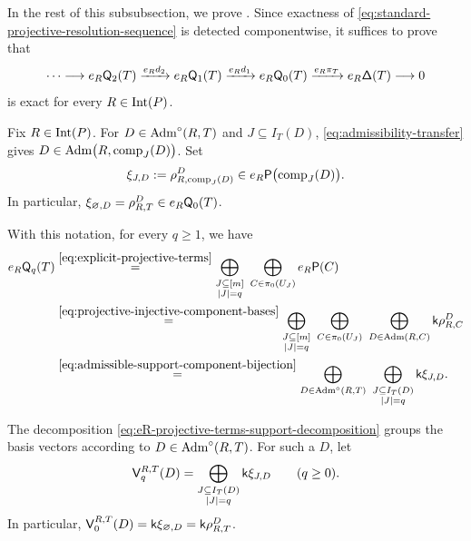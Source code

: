 In the rest of this subsubsection, we prove
.
Since exactness of
\eqref{eq:standard-projective-resolution-sequence}
is detected componentwise, it suffices to prove that
\begin{equation}
\label{eq:eR-standard-projective-resolution-sequence}
\cdots
\longrightarrow
e_R\mathsf Q_2(T)
\xrightarrow{e_Rd_2}
e_R\mathsf Q_1(T)
\xrightarrow{e_Rd_1}
e_R\mathsf Q_0(T)
\xrightarrow{e_R\pi_T}
e_R\mathsf\Delta(T)
\longrightarrow0
\end{equation}
is exact for every $R\in\operatorname{Int}(P)$.

Fix $R\in\operatorname{Int}(P)$. For $D\in\operatorname{Adm}^\circ(R,T)$ and
$J\subseteq I_T(D)$,
\eqref{eq:admissibility-transfer} gives
$D\in\operatorname{Adm}\bigl(R,\operatorname{comp}_J(D)\bigr)$. Set
\begin{equation}
\label{eq:xiJD-definition}
\xi_{J,D}
:=
\rho_{R,\operatorname{comp}_J(D)}^{D}
\in
e_R\mathsf P\bigl(\operatorname{comp}_J(D)\bigr).
\end{equation}
In particular, 
$\xi_{\varnothing,D}=\rho_{R,T}^{D}
\in e_R\mathsf Q_0(T)$.


With this notation, for every $q\geq1$, we have
\begin{align}
e_R\mathsf Q_q(T)
&\overset{\eqref{eq:explicit-projective-terms}}{=}
\bigoplus_{\substack{J\subseteq[m]\\|J|=q}}
\ \bigoplus_{C\in\pi_0(U_J)}
e_R\mathsf P(C)
\notag\\
&\overset{\eqref{eq:projective-injective-component-bases}}{=}
\bigoplus_{\substack{J\subseteq[m]\\|J|=q}}
\ \bigoplus_{C\in\pi_0(U_J)}
\ \bigoplus_{D\in\operatorname{Adm}(R,C)}
\mathsf{k}\rho_{R,C}^{D}
\notag\\
&\overset{\eqref{eq:admissible-support-component-bijection}}{=}
\bigoplus_{D\in\operatorname{Adm}^\circ(R,T)}
\ \bigoplus_{\substack{J\subseteq I_T(D)\\|J|=q}}
\mathsf{k}\xi_{J,D}.
\label{eq:eR-projective-terms-support-decomposition}
\end{align}

The decomposition
\eqref{eq:eR-projective-terms-support-decomposition}
groups the basis vectors according to
$D\in\operatorname{Adm}^\circ(R,T)$.  
For such a $D$, let
\begin{equation}
\label{eq:VRTD-definition}
\mathsf V_q^{R,T}(D)
=
\bigoplus_{\substack{J\subseteq I_T(D)\\|J|=q}}
\mathsf{k}\xi_{J,D}
\qquad
(q\geq0).
\end{equation}
In particular,
$\mathsf V_0^{R,T}(D)=\mathsf{k}\xi_{\varnothing,D} = \mathsf{k}\rho_{R,T}^D$.

